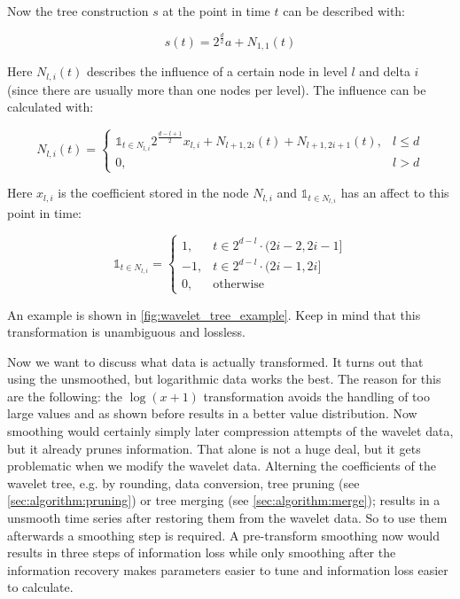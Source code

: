 Now the tree construction $s$ at the point in time $t$ can be described with:

\begin{equation}\label{eq:tree}
    s(t) = 2^\frac{d}{2} a + N_{1,1}(t)
\end{equation}

Here $N_{l, i}(t)$ describes the influence of a certain node in level $l$ and delta $i$ (since there are usually more than one nodes per level). The influence can be calculated with:

\begin{equation}\label{eq:node}
    N_{l, i}(t) = \begin{cases}
        \mathbb{1}_{t \in N_{l, i}} 2^\frac{d - l + 1}{2} x_{l, i} + N_{l + 1, 2i}(t) + N_{l + 1, 2i + 1}(t), & l \leq d \\
        0, & l > d
    \end{cases}
\end{equation}

Here $x_{l, i}$ is the coefficient stored in the node $N_{l, i}$ and $\mathbb{1}_{t \in N_{l, i}}$ has an affect to this point in time:

\begin{equation}\label{eq:matches}
    \mathbb{1}_{t \in N_{l, i}} = \begin{cases}
        1, & t \in 2^{d - l} \cdot (2i - 2, 2i - 1 ] \\
        -1, & t \in 2^{d - l} \cdot (2i - 1, 2i ] \\
        0, & \text{otherwise}
    \end{cases}
\end{equation}

An example is shown in \autoref{fig:wavelet_tree_example}. Keep in mind that this transformation is unambiguous and lossless.

Now we want to discuss what data is actually transformed. It turns out that using the unsmoothed, but logarithmic data works the best. The reason for this are the following: the $\log(x + 1)$ transformation avoids the handling of too large values and as shown before results in a better value distribution. Now smoothing would certainly simply later compression attempts of the wavelet data, but it already prunes information. That alone is not a huge deal, but it gets problematic when we modify the wavelet data. Alterning the coefficients of the wavelet tree, e.g. by rounding, data conversion, tree pruning (see \autoref{sec:algorithm:pruning}) or tree merging (see \autoref{sec:algorithm:merge}); results in a unsmooth time series after restoring them from the wavelet data. So to use them afterwards a smoothing step is required. A pre-transform smoothing now would results in three steps of information loss while only smoothing after the information recovery makes parameters easier to tune and information loss easier to calculate.



